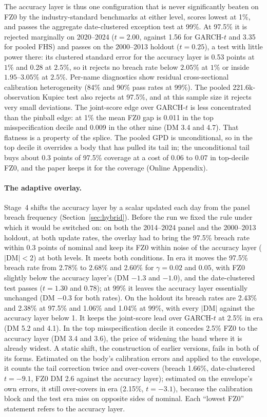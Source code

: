 \documentclass[11pt]{article}
\theoremstyle{remark}
\begin{document}
The accuracy layer is thus one configuration that is never significantly beaten on FZ0 by the industry-standard benchmarks at either level, scores lowest at 1\%, and passes the aggregate date-clustered exception test at 99\%. At 97.5\% it is rejected marginally on 2020--2024 ($t=2.00$, against 1.56 for GARCH-$t$ and 3.35 for pooled FHS) and passes on the 2000--2013 holdout ($t=0.25$), a test with little power there: its clustered standard error for the accuracy layer is 0.53 points at $1\%$ and 0.28 at $2.5\%$, so it rejects no breach rate below $2.05\%$ at $1\%$ or inside $1.95$--$3.05\%$ at $2.5\%$. Per-name diagnostics show residual cross-sectional calibration heterogeneity (84\% and 90\% pass rates at 99\%). The pooled 221.6k-observation Kupiec test also rejects at 97.5\%, and at this sample size it rejects very small deviations. The joint-score edge over GARCH-$t$ is less concentrated than the pinball edge: at 1\% the mean FZ0 gap is 0.011 in the top misspecification decile and 0.009 in the other nine (DM 3.4 and 4.7). That flatness is a property of the splice. The pooled GPD is unconditional, so in the top decile it overrides a body that has pulled its tail in; the unconditional tail buys about 0.3 points of 97.5\% coverage at a cost of 0.06 to 0.07 in top-decile FZ0, and the paper keeps it for the coverage (Online Appendix).

\paragraph{The adaptive overlay.} Stage~4 shifts the accuracy layer by a scalar updated each day from the panel breach frequency (Section~\ref{sec:hybrid}). Before the run we fixed the rule under which it would be switched on: on both the 2014--2024 panel and the 2000--2013 holdout, at both update rates, the overlay had to bring the 97.5\% breach rate within 0.3 points of nominal and keep its FZ0 within noise of the accuracy layer ($|\mathrm{DM}|<2$) at both levels. It meets both conditions. In era it moves the 97.5\% breach rate from 2.78\% to 2.68\% and 2.60\% for $\gamma=0.02$ and $0.05$, with FZ0 slightly below the accuracy layer's (DM $-1.3$ and $-1.0$), and the date-clustered test passes ($t=1.30$ and $0.78$); at 99\% it leaves the accuracy layer essentially unchanged (DM $-0.3$ for both rates). On the holdout its breach rates are 2.43\% and 2.38\% at 97.5\% and 1.06\% and 1.04\% at 99\%, with every $|\mathrm{DM}|$ against the accuracy layer below 1. It keeps the joint-score lead over GARCH-$t$ at 2.5\% in era (DM 5.2 and 4.1). In the top misspecification decile it concedes 2.5\% FZ0 to the accuracy layer (DM 3.4 and 3.6), the price of widening the band where it is already widest. A static shift, the construction of earlier versions, fails in both of its forms. Estimated on the body's calibration errors and applied to the envelope, it counts the tail correction twice and over-covers (breach 1.66\%, date-clustered $t=-9.1$, FZ0 DM 2.6 against the accuracy layer); estimated on the envelope's own errors, it still over-covers in era (2.15\%, $t=-3.1$), because the calibration block and the test era miss on opposite sides of nominal. Each ``lowest FZ0'' statement refers to the accuracy layer.
\end{document}
